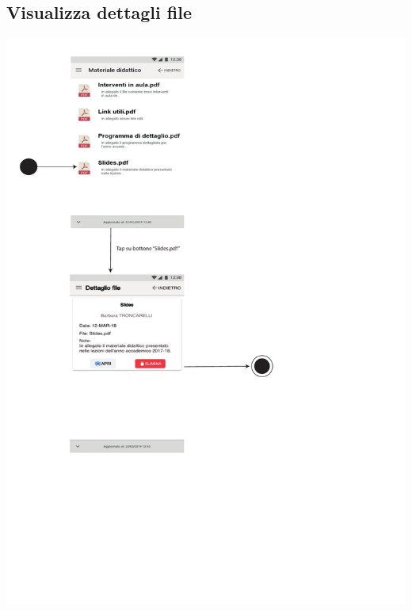 \subsection{Visualizza dettagli file}
\begin{center}
	\includegraphics[width=6in]{imgs/gruppo1/activity_diagrams/AD15_dettagli_file.pdf}
\end{center}
\newpage


